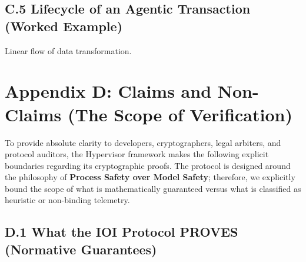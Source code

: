 \documentclass[
  11pt,
]{article}
\begin{document}
\hypertarget{c.5-lifecycle-of-an-agentic-transaction-worked-example}{%
\subsection{C.5 Lifecycle of an Agentic Transaction (Worked
Example)}\label{c.5-lifecycle-of-an-agentic-transaction-worked-example}}

Linear flow of data transformation.

\hypertarget{appendix-d-claims-and-non-claims-the-scope-of-verification}{%
\section{Appendix D: Claims and Non-Claims (The Scope of
Verification)}\label{appendix-d-claims-and-non-claims-the-scope-of-verification}}

\begin{center}
\end{center}

To provide absolute clarity to developers, cryptographers, legal
arbiters, and protocol auditors, the Hypervisor framework makes the
following explicit boundaries regarding its cryptographic proofs. The
protocol is designed around the philosophy of \textbf{Process Safety
over Model Safety}; therefore, we explicitly bound the scope of what is
mathematically guaranteed versus what is classified as heuristic or
non-binding telemetry.

\hypertarget{d.1-what-the-ioi-protocol-proves-normative-guarantees}{%
\subsection{D.1 What the IOI Protocol PROVES (Normative
Guarantees)}\label{d.1-what-the-ioi-protocol-proves-normative-guarantees}}
\end{document}
